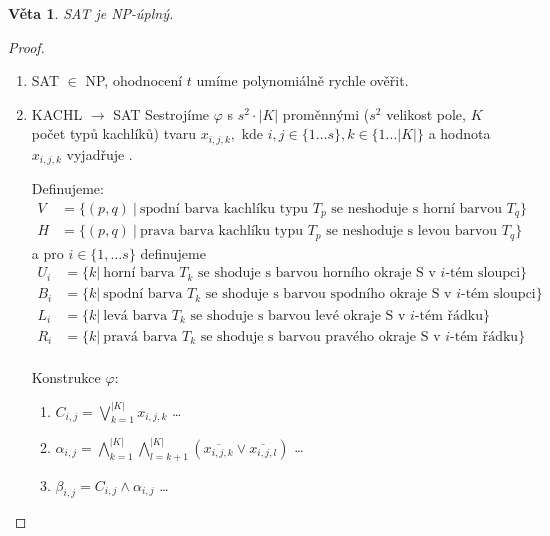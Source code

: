 \documentclass[11pt]{report} %
\newtheorem{theorem}{Věta}[section]
\numberwithin{equation}{section}
\begin{document}
\begin{theorem}
SAT je NP-úplný.
\end{theorem}
\begin{proof}
\begin{enumerate}
	
	
	\item SAT $\in$ NP, ohodnocení $t$ umíme polynomiálně rychle ověřit.
	
	\item KACHL $\rightarrow$ SAT
	Sestrojíme $\varphi$ s $s^2 \cdot |K|$ proměnnými ($s^2$ velikost pole, $K$ počet typů kachlíků) tvaru $x_{i,j,k}, \text{ kde } i,j \in \{1\dots s\}, k \in \{1\dots|K|\} $ a hodnota $x_{i,j,k}$ vyjadřuje .
	
	Definujeme:
	\begin{align*}
		V &= \{(p,q)\ |\ \text{spodní barva kachlíku typu $T_p$ se neshoduje s horní barvou $T_q$} \}\\
		H &= \{(p,q)\ |\ \text{prava barva kachlíku typu $T_p$ se neshoduje s levou barvou $T_q$} \}		
	\end{align*}
	a pro $i \in \{1, \dots s\}$ definujeme
	\begin{align*}
		U_i &= \{k |\ \text{horní barva $T_k$ se shoduje s barvou horního okraje S v $i$-tém sloupci} \}\\
		B_i &= \{k |\ \text{spodní barva $T_k$ se shoduje s barvou spodního okraje S v $i$-tém sloupci} \}\\
		L_i &= \{k |\ \text{levá barva $T_k$ se shoduje s barvou levé okraje S v $i$-tém řádku} \}\\
		R_i &= \{k |\ \text{pravá barva $T_k$ se shoduje s barvou pravého okraje S v $i$-tém řádku} \}\\
	\end{align*}

	Konstrukce $\varphi$:
	\begin{enumerate}
		
		\item $C_{i,j} = \bigvee\limits_{k=1}^{|K|} x_{i,j,k}$ \quad\dots\quad {}
		
		\item $\alpha_{i,j} = \bigwedge\limits_{k=1}^{|K|}\bigwedge\limits_{l=k+1}^{|K|} (\overline{x_{i,j,k}} \vee \overline{x_{i,j,l}})$ \quad\dots\quad {}
		
		\item $\beta_{i,j} = C_{i,j} \wedge \alpha_{i,j}$ \quad\dots\quad {}
		

\end{enumerate}
\end{enumerate}
\end{proof}
\end{document}
